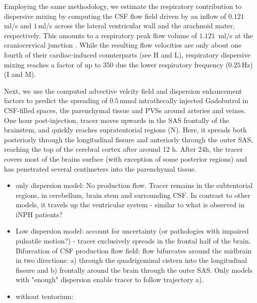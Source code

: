\documentclass[fleqn,10pt]{wlscirep}
\begin{document}
Employing the same methodology, we estimate the respiratory contribution to dispersive mixing by computing the CSF flow field driven by an inflow of $0.121\,$ml/s \cite{liu2024using} and $1\,$ml/s \cite{gutierrez2022effect} across the lateral ventricular wall and the arachnoid mater, respectively. This amounts to a respiratory peak flow volume of $1.121\,$ ml/s at the craniocervical junction \cite{gutierrez2022effect}. While the resulting flow velocities are only about one fourth of their cardiac-induced counterparts (see H and L), respiratory dispersive mixing reaches a factor of up to 350 due the lower respiratory frequency ($0.25\,$Hz) (I and M).


Next, we use the computed advective velcity field and dispersion enhancement factors to predict the spreading of $0.5\,$mmol intrathecally injected Gadobutrol in CSF-filled spaces, the parenchymal tissue and PVSs around arteries and veines. One hour post-injection, tracer moves upwards in the SAS frontally of the brainstem,  and quickly reaches supratentorial regions (N). Here, it spreads both posteriorly through the longitudinal fissure and anteriorly through the outer SAS, reaching the top of the cerebral cortex after around 12 h. After 24h, the tracer covers most of the brains surface (with exception of some posterior regions) and has penetrated several centimeters into the parenchymal tissue.



\begin{itemize}
    \item only dispersion model: No production flow. Tracer remains in the subtentorial regions, in cerebellum, brain stem and surrounding CSF. In contrast to other models, it travels up the ventricular system - similar to what is observed in iNPH patients?
    \item Low dispersion model: account for uncertainty (or pathologies with impaired pulsatile motion?) - tracer exclusively spreads in the frontal half of the brain. Bifurcation of CSF production flow field: flow bifurcates around the midbrain in two directions: a) through the quadrigeminal cistern into the longitudinal fissure and b) frontally around the brain through the outer SAS. Only models with "enough" dispersion enable tracer to follow trajectory a).
    \item without tentorium: 
\end{itemize}
\end{document}
